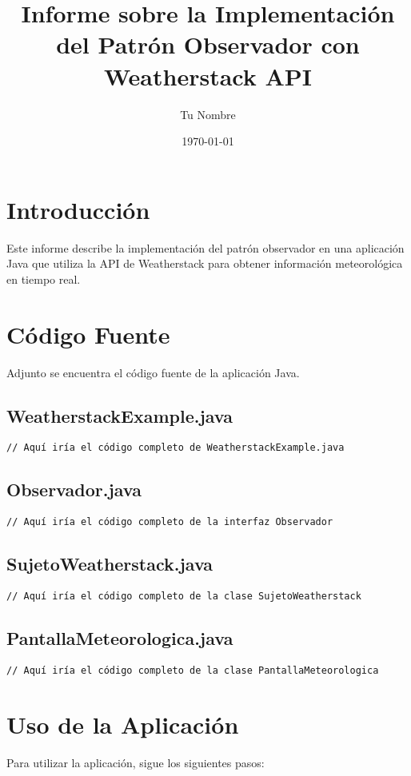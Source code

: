 \documentclass{article}
\title{Informe sobre la Implementación del Patrón Observador con Weatherstack API}
\author{Tu Nombre}
\date{\today}
\begin{document}
\maketitle

\section{Introducción}
Este informe describe la implementación del patrón observador en una aplicación Java que utiliza la API de Weatherstack para obtener información meteorológica en tiempo real.

\section{Código Fuente}
Adjunto se encuentra el código fuente de la aplicación Java.

\subsection{WeatherstackExample.java}
\begin{verbatim}
// Aquí iría el código completo de WeatherstackExample.java
\end{verbatim}

\subsection{Observador.java}
\begin{verbatim}
// Aquí iría el código completo de la interfaz Observador
\end{verbatim}

\subsection{SujetoWeatherstack.java}
\begin{verbatim}
// Aquí iría el código completo de la clase SujetoWeatherstack
\end{verbatim}

\subsection{PantallaMeteorologica.java}
\begin{verbatim}
// Aquí iría el código completo de la clase PantallaMeteorologica
\end{verbatim}

\section{Uso de la Aplicación}
Para utilizar la aplicación, sigue los siguientes pasos:
\end{document}
